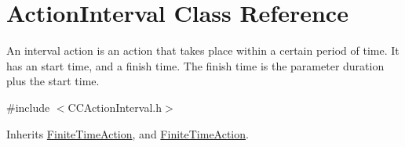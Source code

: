\hypertarget{classActionInterval}{}\section{Action\+Interval Class Reference}
\label{classActionInterval}


An interval action is an action that takes place within a certain period of time. It has an start time, and a finish time. The finish time is the parameter duration plus the start time.  




{\ttfamily \#include $<$C\+C\+Action\+Interval.\+h$>$}



Inherits \hyperlink{classFiniteTimeAction}{Finite\+Time\+Action}, and \hyperlink{classFiniteTimeAction}{Finite\+Time\+Action}.



